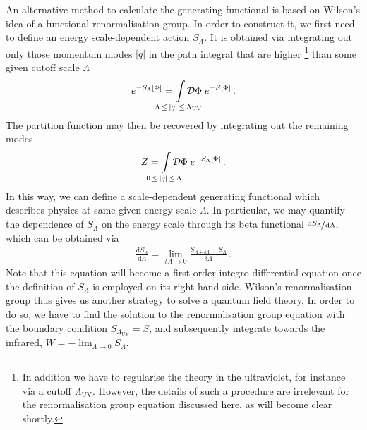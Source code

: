 \documentclass[11pt]{book}
\newcommand{\LambdaUV}{ \Lambda_{\scriptscriptstyle{\mathrm{UV}}} }
\newcommand{\SLambda}{ S_{\scriptscriptstyle{\Lambda}} }
\numberwithin{equation}{chapter}
\begin{document}
An alternative method to calculate the generating functional is based
on Wilson's idea of a functional renormalisation group.
In order to construct it, we first need to define an energy scale-dependent
action $\SLambda$. It is obtained via integrating out only those
momentum modes $|q|$ in the path integral that are higher%
\footnote{%
  In addition we have to regularise the theory in the ultraviolet,
  for instance via a cutoff $\LambdaUV$. However, the details
  of such a procedure are irrelevant for the renormalisation group
  equation discussed here, as will become clear shortly.
}
than some given cutoff scale $\Lambda$
\begin{align}
  e^{ - \SLambda \lbrack \Phi \rbrack }
  = \smashoperator{ \int_{ \Lambda \, \leq \, |q| \, \leq \, \LambdaUV } }
  \mathcal D \Phi \;
  e^{-S \lbrack \Phi \rbrack} \,.
\end{align}
The partition function may then be recovered by integrating out
the remaining modes
\begin{align}
  Z
  = \smashoperator{ \int_{ 0 \, \leq \, |q| \, \leq \, \Lambda } }
  \mathcal D \Phi \;
  e^{-\SLambda \lbrack \Phi \rbrack} \,.
\end{align}
In this way, we can define a scale-dependent generating functional which
describes physics at same given energy scale $\Lambda$.
In particular, we may quantify the dependence
of $\SLambda$ on the energy scale through its
beta functional $\nicefrac{ \mathrm d\SLambda }{ \mathrm d\Lambda }$,
which can be obtained via
\begin{align}
  \frac{ \mathrm d \SLambda }{ \mathrm d \Lambda }
  = \lim_{ \delta \Lambda \rightarrow 0 }
  \frac{ S_{\scriptscriptstyle{\Lambda+\delta\Lambda}} - \SLambda }{ \delta \Lambda } \,.
  \label{eq:wilsonRG}
\end{align}
Note that this equation will become a first-order integro-differential equation
once the definition of $\SLambda$ is employed on its right hand side.
Wilson's renormalisation group thus gives us another strategy to
solve a quantum field theory. In order to do so, we have to find the solution to
the renormalisation group equation with the boundary condition
$S_{\LambdaUV} = S$,
and subsequently integrate towards the infrared,
$W = - \lim_{\Lambda \rightarrow 0} \SLambda$.
\end{document}
